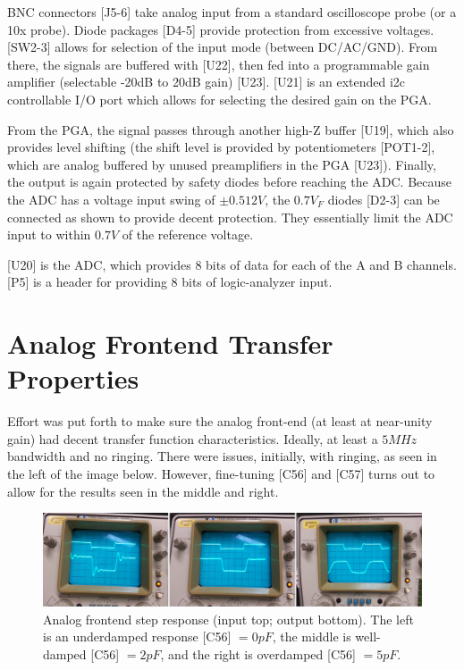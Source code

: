 BNC connectors [J5-6] take analog input from a standard oscilloscope probe (or a 10x probe). Diode packages [D4-5] provide protection from excessive voltages. [SW2-3] allows for selection of the input mode (between DC/AC/GND). From there, the signals are buffered with [U22], then fed into a programmable gain amplifier (selectable -20dB to 20dB gain) [U23]. [U21] is an extended i2c controllable I/O port which allows for selecting the desired gain on the PGA.

From the PGA, the signal passes through another high-Z buffer [U19], which also provides level shifting (the shift level is provided by potentiometers [POT1-2], which are analog buffered by unused preamplifiers in the PGA [U23]). Finally, the output is again protected by safety diodes before reaching the ADC. Because the ADC has a voltage input swing of $\pm 0.512V$, the $0.7V_F$ diodes [D2-3] can be connected as shown to provide decent protection. They essentially limit the ADC input to within $0.7V$ of the reference voltage.

[U20] is the ADC, which provides 8 bits of data for each of the A and B channels. [P5] is a header for providing 8 bits of logic-analyzer input.

\section{Analog Frontend Transfer Properties}

Effort was put forth to make sure the analog front-end (at least at near-unity gain) had decent transfer function characteristics. Ideally, at least a $5MHz$ bandwidth and no ringing. There were issues, initially, with ringing, as seen in the left of the image below. However, fine-tuning [C56] and [C57] turns out to allow for the results seen in the middle and right.

\begin{figure}[ht!]
    \centering
    \includegraphics[width=6in]{specs/tuning.png}
		\caption{Analog frontend step response (input top; output bottom). The left is an underdamped response [C56] $= 0pF$, the middle is well-damped [C56] $= 2pF$, and the right is overdamped [C56] $= 5pF$.}
\end{figure}

